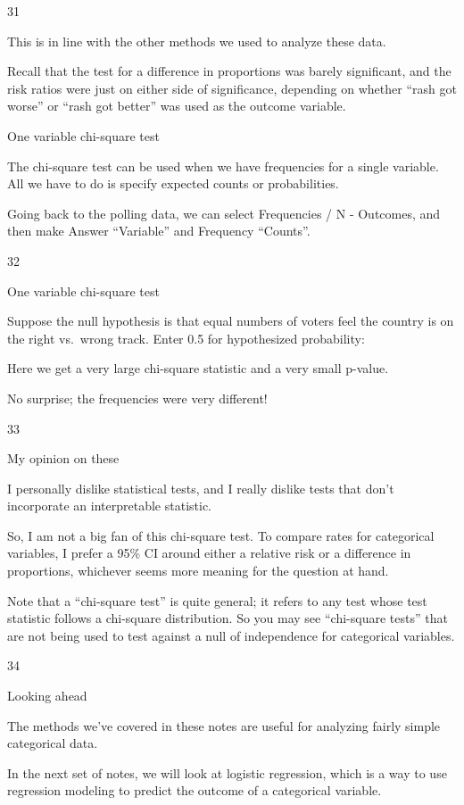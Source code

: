 \documentclass[
  letterpaper,
  DIV=11,
  numbers=noendperiod]{scrreprt}
\begin{document}
31

This is in line with the other methods we used to analyze these data.

Recall that the test for a difference in proportions was barely
significant, and the risk ratios were just on either side of
significance, depending on whether ``rash got worse'' or ``rash got
better'' was used as the outcome variable.

One variable chi-square test

The chi-square test can be used when we have frequencies for a single
variable. All we have to do is specify expected counts or probabilities.

Going back to the polling data, we can select Frequencies / N -
Outcomes, and then make Answer ``Variable'' and Frequency ``Counts''.

32

One variable chi-square test

Suppose the null hypothesis is that equal numbers of voters feel the
country is on the right vs.~wrong track. Enter 0.5 for hypothesized
probability:

Here we get a very large chi-square statistic and a very small p-value.

No surprise; the frequencies were very different!

33

My opinion on these

I personally dislike statistical tests, and I really dislike tests that
don't incorporate an interpretable statistic.

So, I am not a big fan of this chi-square test. To compare rates for
categorical variables, I prefer a 95\% CI around either a relative risk
or a difference in proportions, whichever seems more meaning for the
question at hand.

Note that a ``chi-square test'' is quite general; it refers to any test
whose test statistic follows a chi-square distribution. So you may see
``chi-square tests'' that are not being used to test against a null of
independence for categorical variables.

34

Looking ahead

The methods we've covered in these notes are useful for analyzing fairly
simple categorical data.

In the next set of notes, we will look at logistic regression, which is
a way to use regression modeling to predict the outcome of a categorical
variable.
\end{document}
